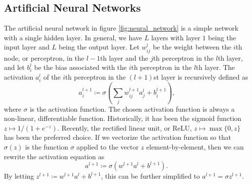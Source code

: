 \documentclass{IEEEtran}
\begin{document}
\subsection{Artificial Neural Networks}
The artificial neural network in figure \ref{fig:neural_network} is a simple
network with a single hidden layer. In general, we have \(L\) layers with layer
\(1\) being the input layer and \(L\) being the output layer. Let
\(w_{ij}^{l}\) be the weight between the \(i\)th node, or perceptron, in the
\(l - 1\)th layer and the \(j\)th perceptron in the \(l\)th layer, and let
\(b_{i}^{l}\) be the bias associated with the \(i\)th perceptron in the \(l\)th
layer. The activation \(a_{i}^{l}\) of the \(i\)th perceptron in the \((l+1)\)st
layer is recursively defined as
\[a_{i}^{l + 1}\coloneqq \sigma\left(\sum_{j} w_{i j}^{l + 1} a_{j}^{l}
 + b_{i}^{l + 1}\right)\text{,}\]
where \(\sigma\) is the activation function. The chosen activation function is
always a non-linear, differentiable function. Historically, it has been the
sigmoid function \(z\mapsto 1/(1 + e^{-z})\). Recently, the rectified linear
unit, or ReLU, \(z\mapsto \max\{0, z\}\) has been the preferred choice. If we
vectorize the activation function so that \(\sigma(z)\) is the function
\(\sigma\) applied to the vector \(z\) element-by-element, then we can rewrite
the activation equation as 
\begin{equation}
    a^{l+1}\coloneqq \sigma \left(w^{l + 1} a^{l} + b^{l + 1}\right)\text{.}
    \label{eqn:forward}
\end{equation}
By letting \(z^{l + 1}\coloneqq w^{l + 1} a^{l} + b^{l + 1}\), this can be
further simplified to \(a^{l + 1} = \sigma z^{l + 1}\).
\end{document}
